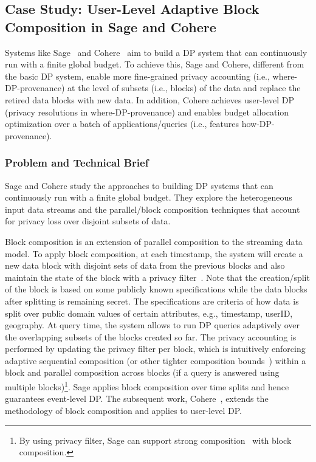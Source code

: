 \subsection{Case Study: User-Level Adaptive Block Composition in Sage and Cohere}

Systems like Sage~\cite{LecuyerSVG019sage} and Cohere~\cite{nicolas2023cohere} aim to build a DP system that can continuously run with a finite global budget.
To achieve this, Sage and Cohere, different from the basic DP system, enable more fine-grained privacy accounting (i.e., where-DP-provenance) at the level of subsets (i.e., blocks) of the data and replace the retired data blocks with new data.
In addition, Cohere achieves user-level DP (privacy resolutions in where-DP-provenance) and enables budget allocation optimization over a batch of applications/queries (i.e., features how-DP-provenance).

\subsubsection{Problem and Technical Brief}
Sage and Cohere study the approaches to building DP systems that can continuously run with a finite global budget.
They explore the heterogeneous input data streams and the parallel/block composition techniques that account for privacy loss over disjoint subsets of data.

Block composition is an extension of parallel composition to the streaming data model.
To apply block composition, at each timestamp, the system will create a new data block with disjoint sets of data from the previous blocks and also maintain the state of the block with a privacy filter~\cite{RogersVRU16odometer}.
Note that the creation/split of the block is based on some publicly known specifications while the data blocks after splitting is remaining secret.
The specifications are criteria of how data is split over public domain values of certain attributes, e.g., timestamp, userID, geography.
At query time, the system allows to run DP queries adaptively over the overlapping subsets of the blocks created so far.
The privacy accounting is performed by updating the privacy filter per block, which is intuitively enforcing adaptive sequential composition (or other tighter composition bounds~\cite{lecuyer2021odometer}) within a block and parallel composition across blocks (if a query is answered using multiple blocks)\footnote{By using privacy filter, Sage can support strong composition~\cite{dwork2010boosting,KairouzOV17} with block composition.}.
Sage applies block composition over time splits and hence guarantees event-level DP.
The subsequent work, Cohere~\cite{nicolas2023cohere}, extends the methodology of block composition and applies to user-level DP.



